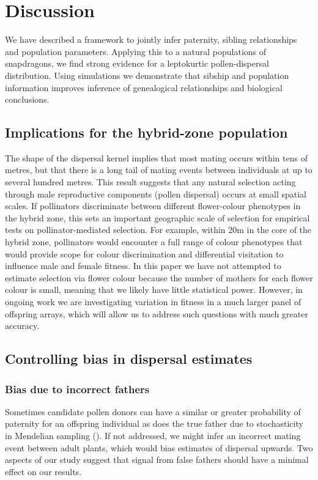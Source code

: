 \documentclass[10pt, a4paper, twocolumn]{article} %
\begin{document}
\section{Discussion}

We have described a framework to jointly infer paternity, sibling relationships and population parameters. 
Applying this to a natural populations of snapdragons, we find strong evidence for a leptokurtic pollen-dispersal distribution.
Using simulations we demonstrate that sibship and population information improves inference of genealogical relationships and biological conclusions.

\subsection{Implications for the hybrid-zone population}

The shape of the dispersal kernel implies that most mating occurs within tens of metres, but that there is a long tail of mating events between individuals at up to several hundred metres. This result suggests that any natural selection acting through male reproductive components (pollen dispersal) occurs at small spatial scales. If pollinators discriminate between different flower-colour phenotypes in the hybrid zone, this sets an important geographic scale of selection for empirical tests on pollinator-mediated selection. For example, within 20m in the core of the hybrid zone, pollinators would encounter a full range of colour phenotypes that would provide scope for colour discrimination and differential visitation to influence male and female fitness. In this paper we have not attempted to estimate selection via flower colour because the number of mothers for each flower colour is small, meaning that we likely have little statistical power. However, in ongoing work we are investigating variation in fitness in a much larger panel of offspring arrays, which will allow us to address such questions with much greater accuracy.

\subsection{Controlling bias in dispersal estimates}

\subsubsection{Bias due to incorrect fathers}

Sometimes candidate pollen donors can have a similar or greater probability of paternity for an offspring individual as does the true father due to stochasticity in Mendelian sampling (\cite{thompson1976paradox}).
If not addressed, we might infer an incorrect mating event between adult plants, which would bias estimates of dispersal upwards.
Two aspects of our study suggest that signal from false fathers should have a minimal effect on our results.
\end{document}
